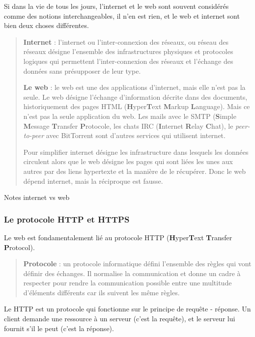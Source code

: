 \documentclass[a4paper]{article}
\begin{document}
Si dans la vie de tous les jours, l'internet et le web sont souvent
considérés comme des notions interchangeables, il n'en est rien, et le
web et internet sont bien deux choses différentes.

\begin{quote}
\textbf{Internet} : l'internet ou l'inter-connexion des réseaux, ou
réseau des réseaux désigne l'ensemble des infrastructures physiques et
protocoles logiques qui permettent l'inter-connexion des réseaux et
l'échange des données sans présupposer de leur type.

\textbf{Le web} : le web est une des applications d'internet, mais
elle n'est pas la seule. Le web désigne l'échange d'information décrite
dans des documents, historiquement des pages HTML
(\textbf{H}yper\textbf{T}ext \textbf{M}arkup \textbf{L}anguage). Mais ce
n'est pas la seule application du web. Les mails avec le SMTP
(\textbf{S}imple \textbf{M}essage \textbf{T}ransfer \textbf{P}rotocole,
les chats IRC (\textbf{I}nternet \textbf{R}elay \textbf{C}hat), le
\emph{peer-to-peer} avec BitTorrent sont d'autres services qui utilisent
internet.

Pour simplifier internet désigne les infrastructure dans lesquels les
données circulent alors que le web désigne les pages qui sont liées les
unes aux autres par des liens hypertexte et la manière de le récupérer.
Donc le web dépend internet, mais la réciproque est fausse.
\end{quote}

            Notes internet vs web

\hypertarget{header-n16}{%
\subsubsection{Le protocole HTTP et HTTPS}\label{header-n16}}

Le web est fondamentalement lié au protocole HTTP
(\textbf{H}yper\textbf{T}ext \textbf{T}ransfer \textbf{P}rotocol).

\begin{quote}
\textbf{Protocole} : un protocole informatique défini l'ensemble des
règles qui vont définir des échanges. Il normalise la communication et
donne un cadre à respecter pour rendre la communication possible entre
une multitude d'éléments différents car ils suivent les même règles.
\end{quote}

Le HTTP est un protocole qui fonctionne sur le principe de requête -
réponse. Un client demande une ressource à un serveur (c'est la
requête), et le serveur lui fournit s'il le peut (c'est la réponse).
\end{document}
